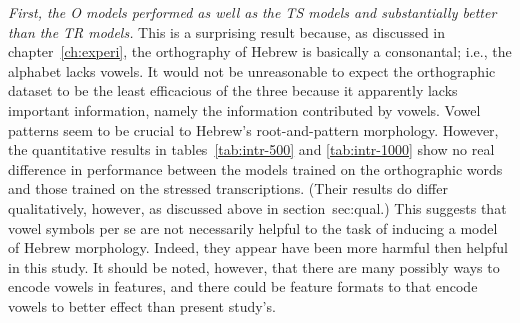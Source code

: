\emph{First, the O models performed as well as the TS models and substantially better than the
  TR models.} 
 This is a surprising result because, as discussed in chapter~\ref{ch:experi}, 
 the orthography of Hebrew is basically a consonantal; i.e., the alphabet lacks vowels. 
It would not be unreasonable to expect the orthographic dataset to be the least efficacious of the three because it
apparently lacks important information, namely the information contributed by vowels. Vowel patterns seem to be crucial to Hebrew's 
root-and-pattern morphology. However, the quantitative results in tables~\ref{tab:intr-500} and \ref{tab:intr-1000} 
show no real difference in performance between the models trained on the orthographic words and those trained on the stressed transcriptions. 
(Their results do differ qualitatively, however, as discussed above in section~{sec:qual}.) 
This suggests that vowel symbols per se are not necessarily 
helpful to the task of inducing a model of Hebrew morphology. Indeed, 
they appear have been more harmful then helpful in this study. It should be 
noted, however, that there are many possibly ways to encode vowels in features, and 
there could be feature formats to that encode vowels to better effect than present study's.

